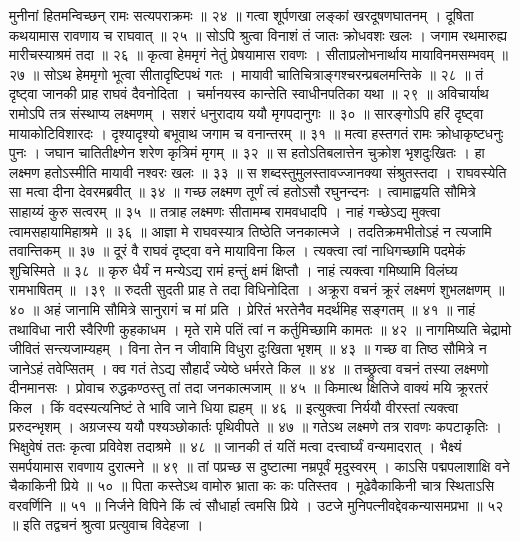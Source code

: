 मुनीनां हितमन्विच्छन् रामः सत्यपराक्रमः ॥ २४ ॥
गत्वा शूर्पणखा लङ्कां खरदूषणघातनम् ।
दूषिता कथयामास रावणाय च राघवात् ॥ २५ ॥
सोऽपि श्रुत्वा विनाशं तं जातः क्रोधवशः खलः ।
जगाम रथमारुह्य मारीचस्याश्रमं तदा ॥ २६ ॥
कृत्वा हेममृगं नेतुं प्रेषयामास रावणः ।
सीताप्रलोभनार्थाय मायाविनमसम्भवम् ॥ २७ ॥
सोऽथ हेममृगो भूत्वा सीतादृष्टिपथं गतः ।
मायावी चातिचित्राङ्गश्चरन्प्रबलमन्तिके ॥ २८ ॥
तं दृष्ट्वा जानकी प्राह राघवं दैवनोदिता ।
चर्मानयस्व कान्तेति स्वाधीनपतिका यथा ॥ २९ ॥
अविचार्याथ रामोऽपि तत्र संस्थाप्य लक्ष्मणम् ।
सशरं धनुरादाय ययौ मृगपदानुगः ॥ ३० ॥
सारङ्गोऽपि हरिं दृष्ट्वा मायाकोटिविशारदः ।
दृश्यादृश्यो बभूवाथ जगाम च वनान्तरम् ॥ ३१ ॥
मत्वा हस्तगतं रामः क्रोधाकृष्टधनुः पुनः ।
जघान चातितीक्ष्णेन शरेण कृत्रिमं मृगम् ॥ ३२ ॥
स हतोऽतिबलात्तेन चुक्रोश भृशदुःखितः ।
हा लक्ष्मण हतोऽस्मीति मायावी नश्वरः खलः ॥ ३३ ॥
स शब्दस्तुमुलस्तावज्जानक्या संश्रुतस्तदा ।
राघवस्येति सा मत्वा दीना देवरमब्रवीत् ॥ ३४ ॥
गच्छ लक्ष्मण तूर्णं त्वं हतोऽसौ रघुनन्दनः ।
त्वामाह्वयति सौ‌मित्रे साहाय्यं कुरु सत्वरम् ॥ ३५ ॥
तत्राह लक्ष्मणः सीतामम्ब रामवधादपि ।
नाहं गच्छेऽद्य मुक्त्वा त्वामसहायामिहाश्रमे ॥ ३६ ॥
आज्ञा मे राघवस्यात्र तिष्ठेति जनकात्मजे ।
तदतिक्रमभीतोऽहं न त्यजामि तवान्तिकम् ॥ ३७ ॥
दूरं वै राघवं दृष्ट्वा वने मायाविना किल ।
त्यक्त्वा त्वां नाधिगच्छामि पदमेकं शुचिस्मिते ॥ ३८ ॥
कृरु धैर्यं न मन्येऽद्य रामं हन्तुं क्षमं क्षिप्तौ ।
नाहं त्यक्त्वा गमिष्यामि विलंघ्य रामभाषितम् ॥ ।३९ ॥
रुदती सुदती प्राह ते तदा विधिनोदिता ।
अक्रूरा वचनं क्रूरं लक्ष्मणं शुभलक्षणम् ॥ ४० ॥
अहं जानामि सौ‌मित्रे सानुरागं च मां प्रति ।
प्रेरितं भरतेनैव मदर्थमिह सङ्गतम् ॥ ४१ ॥
नाहं तथाविधा नारी स्वैरिणी कुहकाधम ।
मृते रामे पतिं त्वां न कर्तुमिच्छामि कामतः ॥ ४२ ॥
नागमिष्यति चेद्रामो जीवितं सन्त्यजाम्यहम् ।
विना तेन न जीवामि विधुरा दुःखिता भृशम् ॥ ४३ ॥
गच्छ वा तिष्ठ सौ‍मित्रे न जानेऽहं तवेप्सितम् ।
क्व गतं तेऽद्य सौहार्दं ज्येष्ठे धर्मरते किल ॥ ४४ ॥
तच्छ्रुत्वा वचनं तस्या लक्ष्मणो दीनमानसः ।
प्रोवाच रुद्धकण्ठस्तु तां तदा जनकात्मजाम् ॥ ४५ ॥
किमात्थ क्षितिजे वाक्यं मयि क्रूरतरं किल ।
किं वदस्यत्यनिष्टं ते भावि जाने धिया ह्यहम् ॥ ४६ ॥
इत्युक्त्वा निर्ययौ वीरस्तां त्यक्त्वा प्ररुदन्भृशम् ।
अग्रजस्य ययौ पश्यञ्छोकार्तः पृथिवीपते ॥ ४७ ॥
गतेऽथ लक्ष्मणे तत्र रावणः कपटाकृतिः ।
भिक्षुवेषं ततः कृत्वा प्रविवेश तदाश्रमे ॥ ४८ ॥
जानकी तं यतिं मत्वा दत्त्वार्घ्यं वन्यमादरात् ।
भैक्ष्यं समर्पयामास रावणाय दुरात्मने ॥ ४९ ॥
तां पप्रच्छ स दुष्टात्मा नम्रपूर्वं मृदुस्वरम् ।
काऽसि पद्मपलाशाक्षि वने चैकाकिनी प्रिये ॥ ५० ॥
पिता कस्तेऽथ वामोरु भ्राता कः कः पतिस्तव ।
मूढेवैकाकिनी चात्र स्थिताऽसि वरवर्णिनि ॥ ५१ ॥
निर्जने विपिने किं त्वं सौधार्हा त्वमसि प्रिये ।
उटजे मुनिपत्‍नीवद्देवकन्यासमप्रभा ॥ ५२ ॥
इति तद्वचनं श्रुत्वा प्रत्युवाच विदेहजा ।
